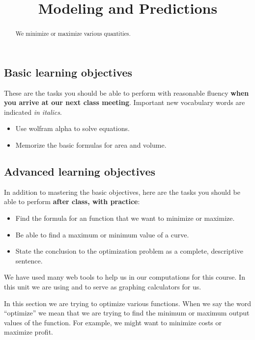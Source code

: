 \documentclass{ximera}
\title{Modeling and Predictions}
\begin{document}
\begin{abstract}
We minimize or maximize various quantities.
\end{abstract}
\maketitle

\subsection*{Basic learning objectives}

These are the tasks you should be able to perform with reasonable fluency \textbf{when you arrive at our next class meeting}. Important new vocabulary words are indicated \emph{in italics}. 

\begin{itemize}
	\item Use wolfram alpha to solve equations.
    \item Memorize the basic formulas for area and volume.
\end{itemize}

\subsection*{Advanced learning objectives}

In addition to mastering the basic objectives, here are the tasks you should be able to perform \textbf{after class, with practice}: 

\begin{itemize}
	\item Find the formula for an function that we want to minimize or maximize.
    \item Be able to find a maximum or minimum value of a curve.
    \item State the conclusion to the optimization problem as a complete, descriptive sentence.
\end{itemize}

\noindent\hrulefill

We have used many web tools to help us in our computations for this course. In this unit we are using  and  to serve as graphing calculators for us. 

In this section we are trying to optimize various functions. When we say the word ``optimize'' we mean that we are trying to find the minimum or maximum output values of the function. For example, we might want to minimize costs or maximize profit.
\end{document}
